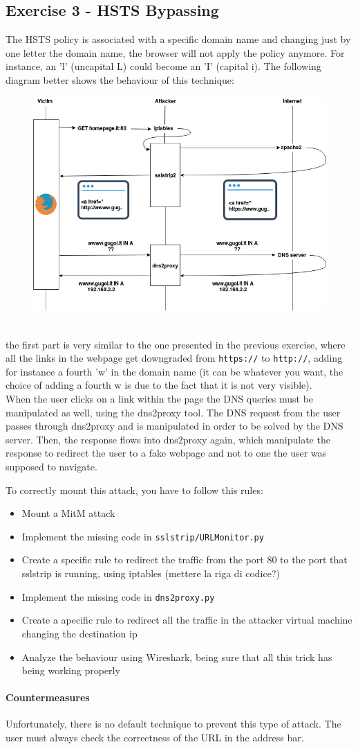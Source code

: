\documentclass{article}
\begin{document}
\subsection{Exercise 3 - HSTS Bypassing}
The HSTS policy is associated with a specific domain name and changing just by one letter the domain name, the browser will
not apply the policy anymore. For instance, an ’l’ (uncapital L) could become an ’I’ (capital i). The following diagram better shows the behaviour of this technique: 
\begin{figure}[h]
  \includegraphics[width=.9\textwidth]{../figures/hsts_bypass_time}
  \caption{}
\end{figure}
\\
the first part is very similar to the one presented in the previous exercise, where all the links in the webpage get downgraded from \texttt{https://} to \texttt{http://}, adding for instance a fourth 'w' in the domain name (it can be whatever you want, the choice of adding a fourth w is due to the fact that it is not very visible).\\
When the user clicks on a link within the page the DNS queries must be manipulated as well, using the dns2proxy tool. The DNS request from the user passes through dns2proxy and is manipulated in order to be solved by the DNS server. Then, the response flows into dns2proxy again, which manipulate the response to redirect the user to a fake webpage and not to one the user was supposed to navigate.  

To correctly mount this attack, you have to follow this rules:
\begin{itemize}
  \item Mount a MitM attack
  \item Implement the missing code in \texttt{sslstrip/URLMonitor.py}
  \item Create a specific rule to redirect the traffic from the port 80 to the port that sslstrip is running, using iptables (mettere la riga di codice?)
  \item Implement the missing code in \texttt{dns2proxy.py}
  \item Create a apecific rule to redirect all the traffic in the attacker virtual machine changing the destination ip
  \item Analyze the behaviour using Wireshark, being sure that all this trick has being working properly
\end{itemize}
\paragraph{Countermeasures}
Unfortunately, there is no default technique to prevent this type of attack. The user must always check the correctness of the URL in the address bar.
\end{document}
